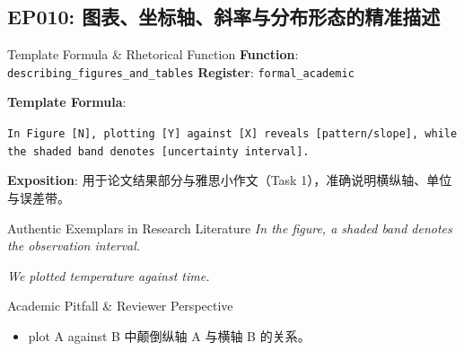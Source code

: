 \subsection{EP010: 图表、坐标轴、斜率与分布形态的精准描述}\label{sec:ep:EP010}
\begin{ConceptBox}{Template Formula \& Rhetorical Function}
\textbf{Function}: \texttt{describing\_figures\_and\_tables} \quad \textbf{Register}: \texttt{formal\_academic}\par\vspace{3pt}
\textbf{Template Formula}:\par\noindent\texttt{In Figure [N], plotting [Y] against [X] reveals [pattern/slope], while the shaded band denotes [uncertainty interval].}\par\vspace{4pt}
\textbf{Exposition}: 用于论文结果部分与雅思小作文（Task 1），准确说明横纵轴、单位与误差带。
\end{ConceptBox}
\begin{ExampleBox}{Authentic Exemplars in Research Literature}
\textit{In the figure, a shaded band denotes the observation interval.}\par\vspace{2pt}
\textit{We plotted temperature against time.}\par\vspace{2pt}
\end{ExampleBox}
\begin{TipBox}{Academic Pitfall \& Reviewer Perspective}
\begin{itemize}[leftmargin=1.5em, itemsep=1pt]
  \item plot A against B 中颠倒纵轴 A 与横轴 B 的关系。
\end{itemize}
\end{TipBox}
\vspace{6pt}

